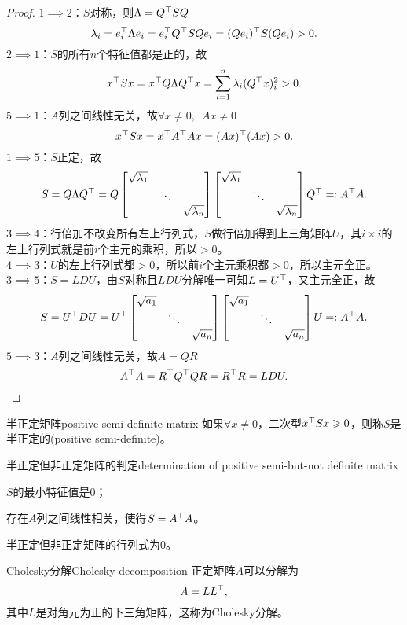 \begin{proof}
	$1\implies 2$：$S$对称，则$\Lambda=Q^\top SQ$
	\[
		\lambda_i=e_i^\top \Lambda e_i=e_i^\top Q^\top SQe_i=(Qe_i)^\top S(Qe_i)>0.
	\]
	$2\implies 1$：$S$的所有$n$个特征值都是正的，故
	\[
		x^\top Sx=x^\top Q\Lambda Q^\top x=\sum_{i=1}^n\lambda_i(Q^\top x)^2_i>0.
	\]
	$5\implies 1$：$A$列之间线性无关，故$\forall x\neq 0,\enspace Ax\neq 0$
	\[
		x^\top Sx=x^\top A^\top Ax=(Ax)^\top(Ax)>0.
	\]
	$1\implies 5$：$S$正定，故
	\[
		S=Q\Lambda Q^\top=Q\begin{bmatrix}
			\sqrt{\lambda_1}\\ &\ddots\\ &&\sqrt{\lambda_n}
		\end{bmatrix}\begin{bmatrix}
			\sqrt{\lambda_1}\\ &\ddots\\ &&\sqrt{\lambda_n}
		\end{bmatrix}Q^\top=:A^\top A.
	\]
	$3\implies 4$：行倍加不改变所有左上行列式，$S$做行倍加得到上三角矩阵$U$，其$i\times i$的左上行列式就是前$i$个主元的乘积，所以$>0$。\\
	$4\implies 3$：$U$的左上行列式都$>0$，所以前$i$个主元乘积都$>0$，所以主元全正。\\
	$3\implies 5$：$S=LDU$，由$S$对称且$LDU$分解唯一可知$L=U^\top$，又主元全正，故
	\[
		S=U^\top DU=U^\top\begin{bmatrix}
			\sqrt{a_1}\\ &\ddots\\ &&\sqrt{a_n}
		\end{bmatrix}\begin{bmatrix}
			\sqrt{a_1}\\ &\ddots\\ &&\sqrt{a_n}
		\end{bmatrix}U=:A^\top A.
	\]
	$5\implies 3$：$A$列之间线性无关，故$A=QR$
	\[
		A^\top A=R^\top Q^\top QR=R^\top R=LDU.
		\qedhere
	\]
\end{proof}
\begin{definition}{半正定矩阵}{positive semi-definite matrix}
	如果$\forall x\neq 0$，二次型$x^\top Sx\geqslant 0$，则称$S$是半正定的(positive semi-definite)。
\end{definition}
\begin{theorem}{半正定但非正定矩阵的判定}{determination of positive semi-but-not definite matrix}
	\begin{compactenum}
		\item $S$的最小特征值是0；
		\item 存在$A$列之间线性相关，使得$S=A^\top A$。
	\end{compactenum}
\end{theorem}
\begin{corollary}
	半正定但非正定矩阵的行列式为0。
\end{corollary}

\begin{theorem}
	{Cholesky分解}{Cholesky decomposition}
	正定矩阵$A$可以分解为
	\begin{equation}
		A=LL^\top,
	\end{equation}
	其中$L$是对角元为正的下三角矩阵，这称为Cholesky分解。
\end{theorem}


